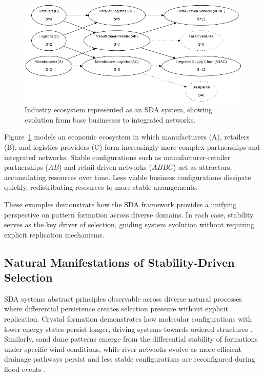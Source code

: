 \documentclass[preprint,12pt]{elsarticle}
\begin{document}
\begin{figure}[h]
    \centering
    \includegraphics[width=1\textwidth]{figure_14.png}
    \caption{Industry ecosystem represented as an SDA system, showing evolution from base businesses to integrated networks.}
    \label{fig:figure_14}
\end{figure}

Figure~\ref{fig:figure_14} models an economic ecosystem in which manufacturers (A), retailers (B), and logistics providers (C) form increasingly more complex partnerships and integrated networks. Stable configurations such as manufacturer-retailer partnerships (\( AB \)) and retail-driven networks (\( ABBC \)) act as attractors, accumulating resources over time. Less viable business configurations dissipate quickly, redistributing resources to more stable arrangements.

These examples demonstrate how the SDA framework provides a unifying perspective on pattern formation across diverse domains. In each case, stability serves as the key driver of selection, guiding system evolution without requiring explicit replication mechanisms.

\subsection{Natural Manifestations of Stability-Driven Selection}

SDA systems abstract principles observable across diverse natural processes where differential persistence creates selection pressure without explicit replication. Crystal formation demonstrates how molecular configurations with lower energy states persist longer, driving systems towards ordered structures \cite{ball1999self}. Similarly, sand dune patterns emerge from the differential stability of formations under specific wind conditions, while river networks evolve as more efficient drainage pathways persist and less stable configurations are reconfigured during flood events \cite{kelso1997dynamic}.
\end{document}

